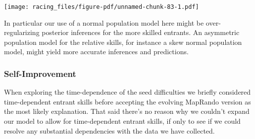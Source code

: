 \documentclass[
  letterpaper,
  DIV=11,
  numbers=noendperiod]{scrartcl}
\newenvironment{Shaded}{\begin{snugshade}}{\end{snugshade}}
\newcommand{\AttributeTok}[1]{\textcolor[rgb]{0.40,0.45,0.13}{#1}}
\newcommand{\ControlFlowTok}[1]{\textcolor[rgb]{0.00,0.23,0.31}{#1}}
\newcommand{\DecValTok}[1]{\textcolor[rgb]{0.68,0.00,0.00}{#1}}
\newcommand{\FloatTok}[1]{\textcolor[rgb]{0.68,0.00,0.00}{#1}}
\newcommand{\FunctionTok}[1]{\textcolor[rgb]{0.28,0.35,0.67}{#1}}
\newcommand{\NormalTok}[1]{\textcolor[rgb]{0.00,0.23,0.31}{#1}}
\newcommand{\OtherTok}[1]{\textcolor[rgb]{0.00,0.23,0.31}{#1}}
\newcommand{\SpecialCharTok}[1]{\textcolor[rgb]{0.37,0.37,0.37}{#1}}
\newcommand{\StringTok}[1]{\textcolor[rgb]{0.13,0.47,0.30}{#1}}
\begin{document}
\begin{Shaded}
\end{Shaded}

\texttt{[image: racing\_files/figure-pdf/unnamed-chunk-83-1.pdf]}

In particular our use of a normal population model here might be
over-regularizing posterior inferences for the more skilled entrants. An
asymmetric population model for the relative skills, for instance a skew
normal population model, might yield more accurate inferences and
predictions.

\subsubsection{Self-Improvement}\label{self-improvement}

When exploring the time-dependence of the seed difficulties we briefly
considered time-dependent entrant skills before accepting the evolving
MapRando version as the most likely explanation. That said there's no
reason why we couldn't expand our model to allow for time-dependent
entrant skills, if only to see if we could resolve any substantial
dependencies with the data we have collected.
\end{document}
